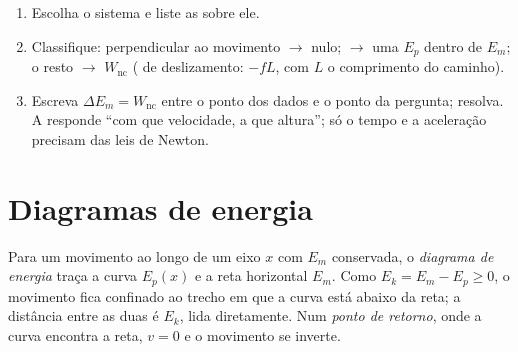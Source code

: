 \begin{method}\label{met:g12:work-and-energy:audit}
\begin{enumerate}
  \item Escolha o sistema e liste as  sobre ele.
  \item Classifique: perpendicular ao movimento $\to$  nulo; 
        $\to$ uma $E_p$ dentro de $E_m$; o resto $\to$ $W_{\text{nc}}$ ( de
        deslizamento: $-fL$, com $L$ o comprimento do caminho).
  \item Escreva $\Delta E_m = W_{\text{nc}}$ entre o ponto dos dados e o ponto da
        pergunta; resolva. A  responde ``com que velocidade, a que altura'';
        só o tempo e a aceleração precisam das leis de Newton.
\end{enumerate}
\end{method}

\section{Diagramas de energia}

\begin{definition}\label{def:g12:work-and-energy:diagram}
Para um movimento ao longo de um eixo $x$ com $E_m$ conservada, o \emph{diagrama de
energia} traça a curva $E_p(x)$ e a reta horizontal $E_m$.
Como $E_k = E_m - E_p \geq 0$, o movimento fica confinado ao trecho em que a curva está
abaixo da reta; a distância entre as duas é $E_k$, lida diretamente. Num \emph{ponto de
retorno}, onde a curva encontra a reta, $v = 0$ e o movimento
se inverte.
\end{definition}

